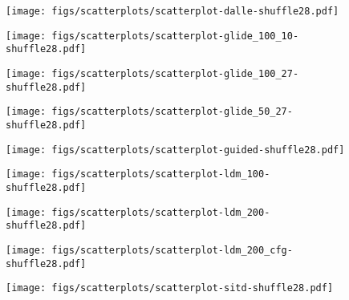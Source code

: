 \begin{figure*}[!ph]
\begin{subfigure}[b]{0.20\linewidth}
    \end{subfigure}
    \begin{subfigure}[b]{0.20\linewidth}
        \centering
        \texttt{[image: figs/scatterplots/scatterplot-dalle-shuffle28.pdf]}
    \end{subfigure}
    \begin{subfigure}[b]{0.20\linewidth}
        \centering
        \texttt{[image: figs/scatterplots/scatterplot-glide\_100\_10-shuffle28.pdf]}
    \end{subfigure}
    \begin{subfigure}[b]{0.20\linewidth}
        \centering
        \texttt{[image: figs/scatterplots/scatterplot-glide\_100\_27-shuffle28.pdf]}
    \end{subfigure}
    \begin{subfigure}[b]{0.20\linewidth}
        \centering
        \texttt{[image: figs/scatterplots/scatterplot-glide\_50\_27-shuffle28.pdf]}
    \end{subfigure}
    \begin{subfigure}[b]{0.20\linewidth}
        \centering
        \texttt{[image: figs/scatterplots/scatterplot-guided-shuffle28.pdf]}
    \end{subfigure}
    \begin{subfigure}[b]{0.20\linewidth}
        \centering
        \texttt{[image: figs/scatterplots/scatterplot-ldm\_100-shuffle28.pdf]}
    \end{subfigure}
    \begin{subfigure}[b]{0.20\linewidth}
        \centering
        \texttt{[image: figs/scatterplots/scatterplot-ldm\_200-shuffle28.pdf]}
    \end{subfigure}
    \begin{subfigure}[b]{0.20\linewidth}
        \centering
        \texttt{[image: figs/scatterplots/scatterplot-ldm\_200\_cfg-shuffle28.pdf]}
    \end{subfigure}
    \begin{subfigure}[b]{0.20\linewidth}
        \centering
        \texttt{[image: figs/scatterplots/scatterplot-sitd-shuffle28.pdf]}

\end{subfigure}
\end{figure*}
